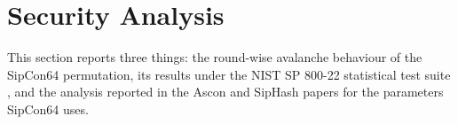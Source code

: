 %
%
%
%

\section{Security Analysis}
\label{sec:security}

This section reports three things: the round-wise avalanche behaviour of the
SipCon64 permutation, its results under the NIST SP 800-22 statistical test
suite \cite{sp800-22}, and the analysis reported in the Ascon and SipHash
papers for the parameters SipCon64 uses.

